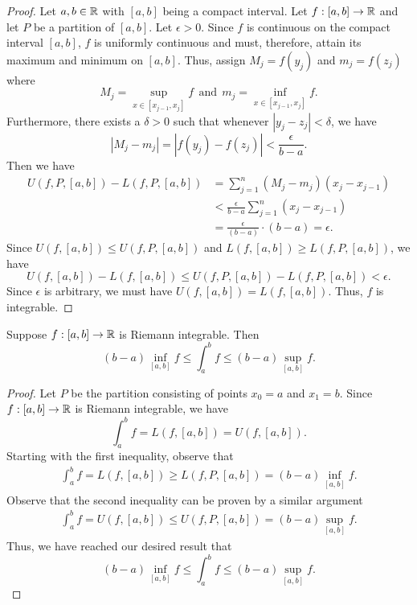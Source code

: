 \documentclass[11pt,a4paper]{book}
\begin{document}
\begin{proof}
    Let \( a,b \in \mathbb{R}  \) with \( [a,b] \) being a compact interval. Let \( f: [a,b]  \to \mathbb{R}   \) and let \( P  \) be a partition of \( [a,b] \). Let \( \epsilon > 0  \). Since \( f \) is continuous on the compact interval \( [a,b] \), \( f \) is uniformly continuous and must, therefore, attain its maximum and minimum on \( [a,b] \). Thus, assign \( {M}_{j} = f({y}_{j})     \) and \( {m}_{j} = f({z}_{j}) \) where 
    \[  {M}_{j} = \sup_{x \in [{x}_{j-1}, {x}_{j} ]} f \ \ \text{and} \ \ {m}_{j} = \inf_{x \in [{x}_{j-1}, {x}_{j}]} f.  \]
    Furthermore, there exists a \( \delta > 0   \) such that whenever \( | {y}_{j}   - {z}_{j} | < \delta  \), we have
    \[  | {M}_{j} - {m}_{j} | = | f({y}_{j}) - f({z}_{j}) | < \frac{ \epsilon }{ b - a  }. \]
    Then we have
    \begin{align*}
        U(f,P,[a,b]) - L(f, P, [a,b]) &= \sum_{ j=1  }^{ n } ({M}_{j} - {m}_{j}) ({x}_{j} - {x}_{j-1})  \\
                                      &< \frac{ \epsilon }{ b-a  }  \sum_{ j=1  }^{ n } ({x}_{j} - {x}_{j-1}) \\
                                      &= \frac{ \epsilon }{ (b - a)  }  \cdot (b-a) = \epsilon.
    \end{align*}
    Since \( U(f,[a,b]) \leq U(f,P,[a,b]) \) and \( L(f,[a,b])  \geq L(f,P,[a,b])\), we have
    \[  U(f,[a,b]) - L(f,[a,b]) \leq U(f, P, [a,b]) - L(f, P, [a,b]) < \epsilon. \]
    Since \( \epsilon \) is arbitrary, we must have \( U(f,[a,b]) = L(f,[a,b]) \). Thus, \( f  \) is integrable.
\end{proof}

\begin{prop}
    Suppose \( f: [a,b] \to \mathbb{R}  \) is Riemann integrable. Then 
    \[  (b-a) \inf_{[a,b]} f \leq \int_{ a }^{ b }  f \leq (b-a) \sup_{[a,b]} f. \]

\end{prop}
\begin{proof}
    Let \( P  \) be the partition consisting of points \( {x}_{0} = a  \) and \( {x}_{1} = b  \). Since \( f: [a,b] \to \mathbb{R}  \) is Riemann integrable, we have 
    \[  \int_{ a }^{ b } f  = L(f,[a,b]) = U(f,[a,b]). \]
    Starting with the first inequality, observe that
    \begin{align*}
        \int_{ a }^{ b } f  = L(f,[a,b]) \geq L(f, P, [a,b]) = (b-a) \inf_{[a,b]} f.
    \end{align*}
    Observe that the second inequality can be proven by a similar argument 
    \begin{align*}
        \int_{ a }^{ b } f  = U(f,[a,b]) \leq U(f,P,[a,b]) = (b-a) \sup_{[a,b]}f.
    \end{align*}
    Thus, we have reached our desired result that
\[  (b-a) \inf_{[a,b]} f \leq \int_{ a }^{ b }  f \leq (b-a) \sup_{[a,b]} f. \]
\end{proof}
\end{document}

